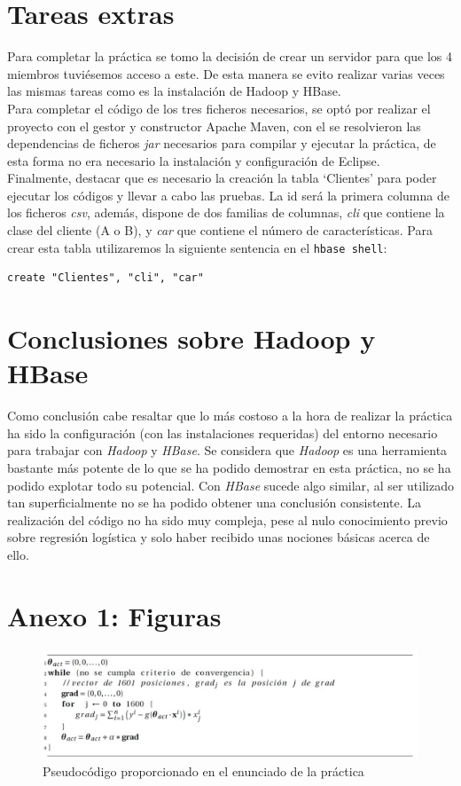 \documentclass[11pt,a4paper]{article}
\begin{document}
\label{listing:enunciado}

\section{Tareas extras}
Para completar la práctica se tomo la decisión de crear un servidor para que los 4 miembros tuviésemos acceso a este. De esta manera se evito realizar varias veces las mismas tareas como es la instalación de Hadoop y HBase. \\
Para completar el código de los tres ficheros necesarios, se optó por realizar el proyecto con el gestor y constructor  Apache Maven, con el se resolvieron las dependencias de ficheros \emph{jar} necesarios para compilar y ejecutar la práctica, de esta forma no era necesario la instalación y configuración de Eclipse.\\
Finalmente, destacar que es necesario la creación la tabla `Clientes' para poder ejecutar los códigos y llevar a cabo las pruebas. La id será la primera columna de los ficheros \emph{csv}, además, dispone de dos familias de columnas, \emph{cli} que contiene la clase del cliente (A o B), y \emph{car} que contiene el número de características. Para crear esta tabla utilizaremos la siguiente sentencia en el \texttt{hbase shell}:

\begin{lstlisting}
create "Clientes", "cli", "car"
\end{lstlisting}

\newpage
\section{Conclusiones sobre Hadoop y HBase}
Como conclusión cabe resaltar que lo más costoso a la hora de realizar la práctica ha sido la configuración (con las instalaciones requeridas) del entorno necesario para trabajar con \emph{Hadoop} y \emph{HBase}. Se considera que \emph{Hadoop} es una herramienta bastante más potente de lo que se ha podido demostrar en esta práctica, no se ha podido explotar todo su potencial. Con \emph{HBase} sucede algo similar, al ser utilizado tan superficialmente no se ha podido obtener una conclusión consistente. La realización del código no ha sido muy compleja, pese al nulo conocimiento previo sobre regresión logística y solo haber recibido unas nociones básicas acerca de ello.
\newpage
\section{Anexo 1: Figuras}

\begin{figure}[h!]
\centering
\includegraphics[scale=0.75]{images/pseudocodigo_enunciado.jpg}
\caption{Pseudocódigo proporcionado en el enunciado de la práctica}
\label{fig:pseudoenunciado}
\end{figure}
\end{document}
